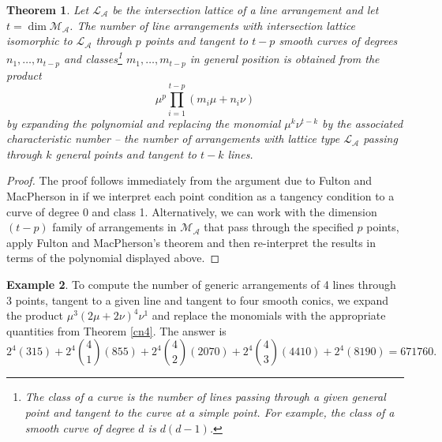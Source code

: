 \documentclass[12pt]{article}
\theoremstyle{plain}
\newtheorem{theorem}{Theorem}
\theoremstyle{definition}
\newtheorem{example}[theorem]{Example}
\newcommand{\A}{\mathcal{A}}
\newcommand{\M}{\mathcal{M}}
\renewcommand{\L}{\mathcal{L}}
\newcommand{\MLA}{\M_{\A}}
\begin{document}
\begin{theorem} \label{FKMt}
Let $\L_\A$ be the intersection lattice of a line arrangement and let
$t = \dim \MLA$. The number of line arrangements with intersection
lattice isomorphic to $\L_\A$ through $p$ points and tangent to $t-p$
smooth curves of degrees $n_1, \ldots, n_{t-p}$ and classes\footnote{The class of a curve is the number of lines passing
through a given general point and tangent to the curve at a simple
point. For example, the class of a smooth curve of degree $d$ is $d(d-1)$.} $m_1,
\ldots, m_{t-p}$ in general position is obtained from the
product $$ \mu^p \prod_{i=1}^{t-p}  (m_i \mu + n_i\nu) $$ by expanding the
polynomial and replacing the monomial $\mu^k \nu^{t-k}$ by the
associated characteristic number -- the number
of arrangements with lattice type $\L_\A$ passing through $k$ general
points and tangent to $t-k$ lines.    
\end{theorem}

\begin{proof}
The proof follows immediately from the argument due to Fulton
and MacPherson in \cite[section 10.4]{Fulton} if we interpret each
point condition as a tangency condition to a curve of degree 0 and
class 1. Alternatively, we can work with the dimension $(t-p)$ family of arrangements in $\M_\A$ that pass through the specified $p$ points, apply Fulton and MacPherson's theorem and then re-interpret the results in terms of the polynomial displayed above. 
\end{proof}

\begin{example}
To compute the number of generic arrangements of 4 lines through 3
points, tangent to a given line and tangent to four smooth conics, we
expand the product $\mu^3(2\mu + 2\nu)^4\nu^1$ and replace the
monomials with the appropriate quantities from Theorem \ref{cn4}. The
answer
is $$2^4(315)+2^4\binom{4}{1}(855)+2^4\binom{4}{2}(2070)+2^4\binom{4}{3}(4410)+
2^4(8190) = 671760. $$
\end{example}
\end{document}
